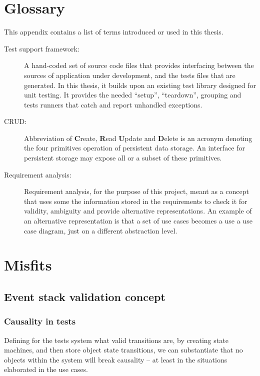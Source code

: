 \chapter{Glossary}
\label{appendix:glossary}
This appendix contains a list of terms introduced or used in this thesis.
\begin{description}
  \item[Test support framework:] A hand-coded set of source code files that provides interfacing between the sources of application under development, and the tests files that are generated. In this thesis, it builds upon an existing test library designed for unit testing. It provides the needed ``setup'', ``teardown'', grouping and tests runners that catch and report unhandled exceptions.
  \item[CRUD:] Abbreviation of \textbf{C}reate, \textbf{R}ead \textbf{U}pdate and \textbf{D}elete is an acronym denoting the four primitives operation of persistent data storage. An interface for persistent storage may expose all or a subset of these primitives.
  \item[Requirement analysis:] Requirement analysis, for the purpose of this project, meant as a concept that uses some the information stored in the requirements to check it for validity, ambiguity and provide alternative representations. An example of an alternative representation is that a set of use cases becomes a use a use case diagram, just on a different abstraction level.
\end{description}

\chapter{Misfits}

\section{Event stack validation concept}
\label{appendix:event-stack-validation}
\subsection{Causality in tests}
Defining for the tests system what valid transitions are, by creating state machines, and then store object state transitions, we can substantiate that no objects within the system will break causality -- at least in the situations elaborated in the use cases.

